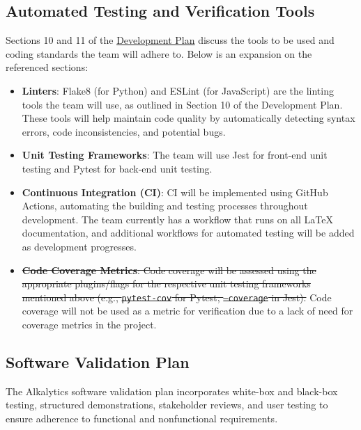 \documentclass[12pt, titlepage]{article}
\begin{document}
\subsection{Automated Testing and Verification Tools} \label{testingTools}
Sections 10 and 11 of the
\href{https://github.com/SumanyaG/Alkalytics/blob/main/docs/DevelopmentPlan/DevelopmentPlan.pdf}{Development
Plan} discuss the tools to be used and coding standards the team will adhere to.
Below is an expansion on the referenced sections:
\begin{itemize}
  \item \textbf{Linters}: Flake8 (for Python) and ESLint (for JavaScript) are
  the linting tools the team will use, as outlined in Section 10 of the
  Development Plan. These tools will help maintain code quality by automatically
  detecting syntax errors, code inconsistencies, and potential bugs.
  \item \textbf{Unit Testing Frameworks}: The team will use Jest for front-end
  unit testing and Pytest for back-end unit testing.
  \item \textbf{Continuous Integration (CI)}: CI will be implemented using
  GitHub Actions, automating the building and testing processes throughout
  development. The team currently has a workflow that runs on all \LaTeX{}
  documentation, and additional workflows for automated testing will be added as
  development progresses. 
  \item \st{\textbf{Code Coverage Metrics}: Code coverage will be assessed using
  the appropriate plugins/flags for the respective unit testing frameworks
  mentioned above (e.g., \texttt{pytest-cov} for Pytest, \texttt{--coverage} in
  Jest).} Code coverage will not be used as a metric for verification due to a
  lack of need for coverage metrics in the project.
\end{itemize}

\subsection{Software Validation Plan}
The Alkalytics software validation plan incorporates white-box and black-box
testing, structured demonstrations, stakeholder reviews, and user testing to
ensure adherence to functional and nonfunctional requirements.
\end{document}
